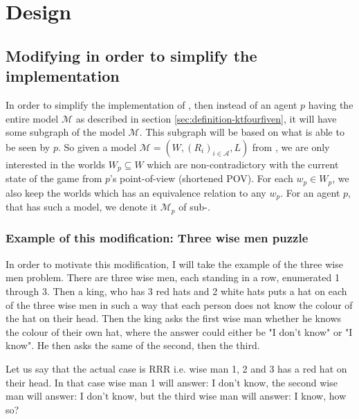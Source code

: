 \section{Design}

\newcommand{\POVModel}{\mathcal{M}}

\subsection{Modifying \SfiveN{} in order to simplify the implementation}
In order to simplify the implementation of \SfiveN{}, then instead of an agent $p$ having the entire model $\mathcal{M}$ as described in section \ref{sec:definition-ktfourfiven}, it will have some subgraph of the model $\mathcal{M}$. This subgraph will be based on what is able to be seen by $p$. So given a model $\mathcal{M} = (W,(R_i)_{i\in \mathcal{A}},L)$ from \SfiveN{}, we are only interested in the worlds $W_{p} \subseteq W$ which are non-contradictory with the current state of the game from $p$'s point-of-view (shortened POV). For each $w_p \in W_{p}$, we also keep the worlds which has an equivalence relation to any $w_p$.
For an agent $p$, that has such a model, we denote it $\mathcal{M}_p$ of sub-\SfiveN{}.

\subsubsection{Example of this modification: Three wise men puzzle}\label{sec:motivation}
In order to motivate this modification, I will take the example of the three wise men problem.
There are three wise men, each standing in a row, enumerated 1 through 3. 
Then a king, who has 3 red hats and 2 white hats puts a hat on each of the three wise men in such a way that each person does not know the colour of the hat on their head. 
Then the king asks the first wise man whether he knows the colour of their own hat, where the answer could either be "I don't know" or "I know". 
He then asks the same of the second, then the third.

Let us say that the actual case is RRR i.e. wise man 1, 2 and 3 has a red hat on their head.
In that case wise man 1 will answer: I don't know, the second wise man will answer: I don't know, but the third wise man will answer: I know, how so?



